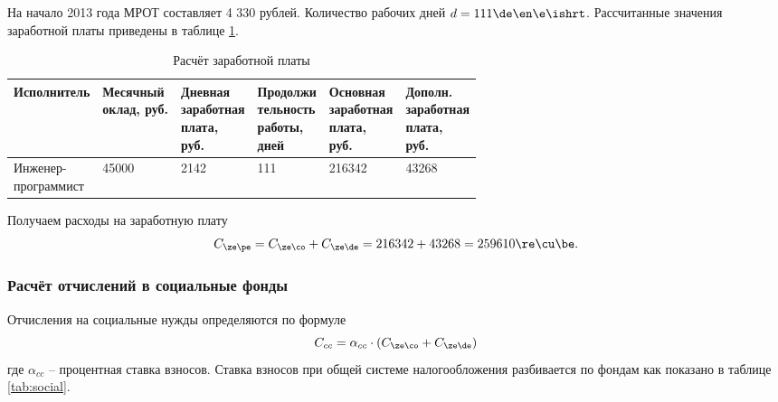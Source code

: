 На начало 2013 года МРОТ составляет 4 330 рублей. Количество рабочих дней $d = 111 \de\en\e\ishrt$. Рассчитанные значения заработной платы приведены в таблице \ref{tab:salary}.

\begin{table}[H]
    \caption{\label{tab:salary}Расчёт заработной платы}
    \begin{tabular}[H]{|l|l|l|l|l|l|}
        \hline
        Исполнитель & \specialcell{Месячный\\оклад, руб.} & \specialcell{Дневная\\заработная\\плата,\\руб.} & \specialcell{Продолжи\\тельность\\работы,\\дней} & \specialcell{Основная\\заработная\\плата,\\руб.} & \specialcell{Дополн.\\заработная\\плата,\\руб.} \\
        \hline
        \specialcell{Инженер-\\программист} & 45000 & 2142 & 111 & 216342 & 43268\\
        \hline
    \end{tabular}
\end{table}

Получаем расходы на заработную плату
\begin{equation*}
    C_{\ze\pe} = C_{\ze\co} + C_{\ze\de} = 216342 + 43268 = 259610 \re\cu\be.
\end{equation*}

\subsubsection{Расчёт отчислений в социальные фонды}
Отчисления на социальные нужды определяются по формуле
\begin{equation*}
    C_{cc} = \alpha_{cc} \cdot (C_{\ze\co} + C_{\ze\de})
\end{equation*}
где $\alpha_{cc}$ -- процентная ставка взносов. Ставка взносов при общей системе налогообложения разбивается по фондам как показано в таблице \ref{tab:social}.

